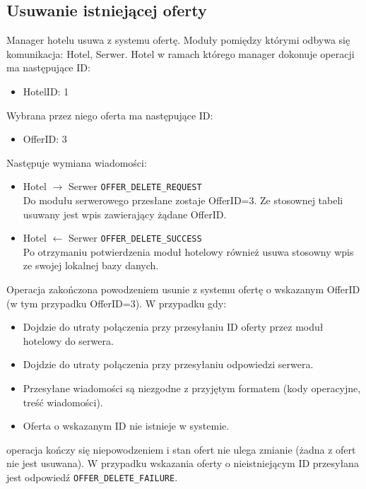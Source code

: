 \documentclass{article}
\begin{document}
\subsection{Usuwanie istniejącej oferty}
Manager hotelu usuwa z systemu ofertę. Moduły pomiędzy którymi odbywa się komunikacja: Hotel, Serwer. Hotel w ramach którego manager dokonuje operacji ma następujące ID:
\begin{itemize}
    \item HotelID: 1
\end{itemize}
Wybrana przez niego oferta ma następujące ID:
\begin{itemize}
    \item OfferID: 3
\end{itemize}
Następuje wymiana wiadomości:
\begin{itemize}
    \item Hotel $\rightarrow$ Serwer \texttt{OFFER\_DELETE\_REQUEST}\\ 
    Do modułu serwerowego przesłane zostaje OfferID=3. Ze stosownej tabeli usuwany jest wpis zawierający żądane OfferID.
    \item Hotel $\leftarrow$ Serwer \texttt{OFFER\_DELETE\_SUCCESS}\\
    Po otrzymaniu potwierdzenia moduł hotelowy również usuwa stosowny wpis ze swojej lokalnej bazy danych.
\end{itemize}
Operacja zakończona powodzeniem usunie z systemu ofertę o wskazanym OfferID (w tym przypadku OfferID=3).
W przypadku gdy:
\begin{itemize}
    \item Dojdzie do utraty połączenia przy przesyłaniu ID oferty przez moduł hotelowy do serwera. 
    \item Dojdzie do utraty połączenia przy przesyłaniu odpowiedzi serwera.
    \item Przesyłane wiadomości są niezgodne z przyjętym formatem (kody operacyjne, treść wiadomości).
    \item Oferta o wskazanym ID nie istnieje w systemie.
\end{itemize}
operacja kończy się niepowodzeniem i stan ofert nie ulega zmianie (żadna z ofert nie jest usuwana). W przypadku wskazania oferty o nieistniejącym ID przesyłana jest odpowiedź \texttt{OFFER\_DELETE\_FAILURE}.
\end{document}
